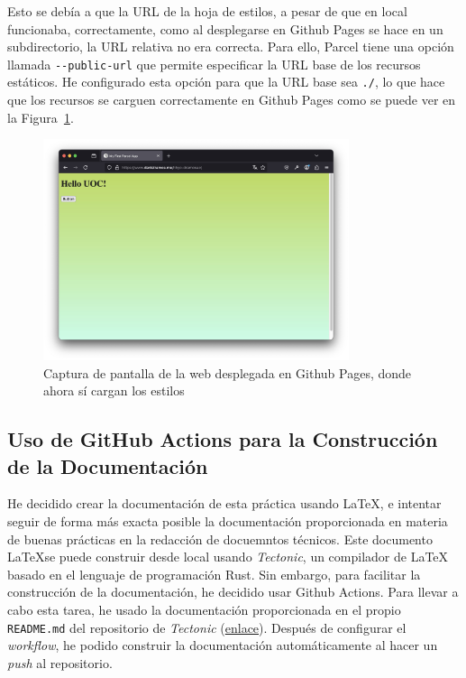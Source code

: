 \documentclass{article}
\begin{document}
Esto se debía a que la URL de la hoja de estilos, a pesar de que en local funcionaba, correctamente, como al desplegarse en Github Pages se hace en un subdirectorio, la URL relativa no era correcta.
Para ello, Parcel tiene una opción llamada \lstinline|--public-url| que permite especificar la URL base de los recursos estáticos.
He configurado esta opción para que la URL base sea \lstinline|./|, lo que hace que los recursos se carguen correctamente en Github Pages como se puede ver en la Figura~\ref{fig:web-deployed}.

\begin{figure}[h!]
    \centering
    \includegraphics[width=0.8\textwidth]{./img/web-deployed}
    \caption{Captura de pantalla de la web desplegada en Github Pages, donde ahora sí cargan los estilos}
    \label{fig:web-deployed}
\end{figure}

\subsection{Uso de GitHub Actions para la Construcción de la Documentación}\label{subsec:uso-de-github-actions-para-la-construccion-de-la-documentacion}

He decidido crear la documentación de esta práctica usando \LaTeX, e intentar seguir de forma más exacta posible la documentación proporcionada en materia de buenas prácticas en la redacción de docuemntos técnicos.
Este documento \LaTeX se puede construir desde local usando \textit{Tectonic}, un compilador de LaTeX basado en el lenguaje de programación Rust.
Sin embargo, para facilitar la construcción de la documentación, he decidido usar Github Actions.
Para llevar a cabo esta tarea, he usado la documentación proporcionada en el propio \lstinline|README.md| del repositorio de \textit{Tectonic} (\href{https://github.com/marketplace/actions/setup-tectonic}{enlace}). Después de configurar el \textit{workflow}, he podido construir la documentación automáticamente al hacer un \textit{push} al repositorio.
\end{document}
